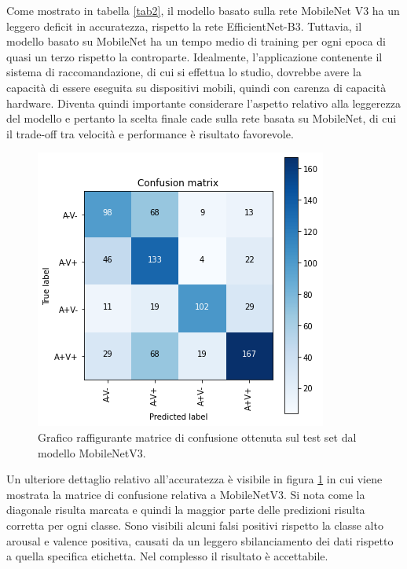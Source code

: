 \documentclass[11pt]{report}
\begin{document}
\vspace{1cm}

Come mostrato in tabella \ref{tab2}, il modello basato sulla rete MobileNet V3 ha un leggero deficit in accuratezza, rispetto la rete EfficientNet-B3. Tuttavia, il modello basato su MobileNet ha un tempo medio di training per ogni epoca di quasi un terzo rispetto la controparte. Idealmente, l'applicazione contenente il sistema di raccomandazione, di cui si effettua lo studio, dovrebbe avere la capacità di essere eseguita su dispositivi mobili, quindi con carenza di capacità hardware. Diventa quindi importante considerare l'aspetto relativo alla leggerezza del modello e pertanto la scelta finale cade sulla rete basata su MobileNet, di cui il trade-off tra velocità e performance è risultato favorevole. 




\begin{figure}[h]
    \centering
    \includegraphics[scale=0.65]{img/CM-MobileNet.png}
    \caption{Grafico raffigurante matrice di confusione ottenuta sul test set dal modello MobileNetV3.}
    \label{fig:cnn-cm}
\end{figure}


Un ulteriore dettaglio relativo all'accuratezza è visibile in figura \ref{fig:cnn-cm} in cui viene mostrata la matrice di confusione relativa a MobileNetV3. Si nota come la diagonale risulta marcata e quindi la maggior parte delle predizioni risulta corretta per ogni classe. Sono visibili alcuni falsi positivi rispetto la classe alto arousal e valence positiva, causati da un leggero sbilanciamento dei dati rispetto a quella specifica etichetta. Nel complesso il risultato è accettabile.
\end{document}

